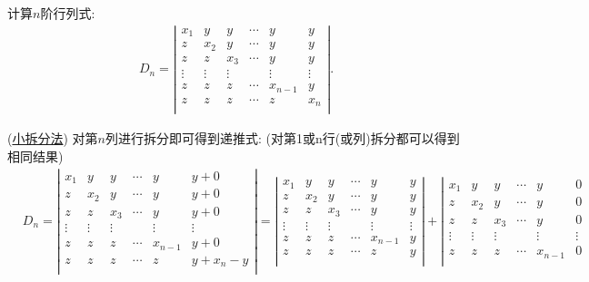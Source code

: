 \documentclass[lang=cn,newtx,10pt,scheme=chinese]{elegantbook}
\begin{document}
\begin{exercise}
计算$n$阶行列式:
\begin{align}
D_n=\left| \begin{matrix}
x_1&		y&		y&		\cdots&		y&		y\\
z&		x_2&		y&		\cdots&		y&		y\\
z&		z&		x_3&		\cdots&		y&		y\\
\vdots&		\vdots&		\vdots&		&		\vdots&		\vdots\\
z&		z&		z&		\cdots&		x_{n-1}&		y\\
z&		z&		z&		\cdots&		z&		x_n\\
\end{matrix} \right|.
\nonumber
\end{align}
\end{exercise}
\begin{solution}(\hyperref[小拆分法]{小拆分法})
对第$n$列进行拆分即可得到递推式:
(对第1或n行(或列)拆分都可以得到相同结果)
\begin{align}
&D_n=\left| \begin{matrix}
x_1&		y&		y&		\cdots&		y&		y+0\\
z&		x_2&		y&		\cdots&		y&		y+0\\
z&		z&		x_3&		\cdots&		y&		y+0\\
\vdots&		\vdots&		\vdots&		&		\vdots&		\vdots\\
z&		z&		z&		\cdots&		x_{n-1}&		y+0\\
z&		z&		z&		\cdots&		z&		y+x_n-y\\
\end{matrix} \right|=\left| \begin{matrix}
x_1&		y&		y&		\cdots&		y&		y\\
z&		x_2&		y&		\cdots&		y&		y\\
z&		z&		x_3&		\cdots&		y&		y\\
\vdots&		\vdots&		\vdots&		&		\vdots&		\vdots\\
z&		z&		z&		\cdots&		x_{n-1}&		y\\
z&		z&		z&		\cdots&		z&		y\\
\end{matrix} \right|+\left| \begin{matrix}
x_1&		y&		y&		\cdots&		y&		0\\
z&		x_2&		y&		\cdots&		y&		0\\
z&		z&		x_3&		\cdots&		y&		0\\
\vdots&		\vdots&		\vdots&		&		\vdots&		\vdots\\
z&		z&		z&		\cdots&		x_{n-1}&		0\\

\end{matrix}
\end{align}
\end{solution}
\end{document}
